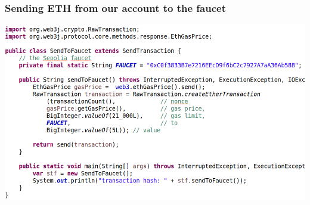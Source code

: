 \documentclass[11pt]{beamer}  %
\begin{document}
\begin{frame}\frametitle{Sending ETH from our account to the faucet}

  \begin{center}
    \includegraphics[width=\textwidth,clip=false]{pictures/send-ether-transaction-java.png}
  \end{center}

\end{frame}


\end{document}
